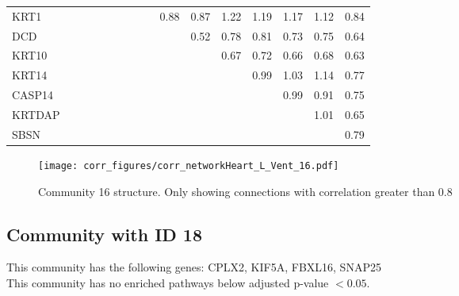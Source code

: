 \begin{longtable}{lrrrrrrrrrrrrrrr}
KRT1    &               &            &           &              &              &            &            &            &      0.88 &        0.87 &        1.22 &         1.19 &         1.17 &       1.12 &          0.84 \\
DCD     &               &            &           &              &              &            &            &            &           &        0.52 &        0.78 &         0.81 &         0.73 &       0.75 &          0.64 \\
KRT10   &               &            &           &              &              &            &            &            &           &             &        0.67 &         0.72 &         0.66 &       0.68 &          0.63 \\
KRT14   &               &            &           &              &              &            &            &            &           &             &             &         0.99 &         1.03 &       1.14 &          0.77 \\
CASP14  &               &            &           &              &              &            &            &            &           &             &             &              &         0.99 &       0.91 &          0.75 \\
KRTDAP  &               &            &           &              &              &            &            &            &           &             &             &              &              &       1.01 &          0.65 \\
SBSN    &               &            &           &              &              &            &            &            &           &             &             &              &              &            &          0.79 \\
\end{longtable}


\begin{figure}[h!]
\centering
\texttt{[image: corr\_figures/corr\_networkHeart\_L\_Vent\_16.pdf]}
\caption{Community 16 structure. Only showing connections with correlation greater than 0.8}
\end{figure}




\subsection*{Community with ID 18}
This community has the following genes: CPLX2, KIF5A, FBXL16, SNAP25
\\
This community has no enriched pathways below adjusted p-value $< 0.05$.

